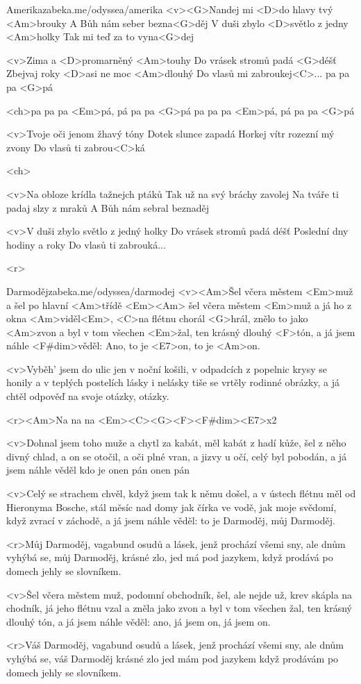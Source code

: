 \begin{song}[Lucie]{24}{Amerika}{zabeka.me/odyssea/amerika}
	<v><G>Nandej mi <D>do hlavy tvý <Am>brouky
	A Bůh nám seber bezna<G>děj
	V duši zbylo <D>světlo z jedny <Am>holky
	Tak mi teď za to vyna<G>dej

	<v>Zima a <D>promarněný <Am>touhy
	Do vrásek stromů padá <G>déšť
	Zbejvaj roky <D>asi ne moc <Am>dlouhý
	Do vlasů mi zabroukej<C>... pa pa pa <G>pá

	<ch>pa pa pa <Em>pá, pá pa pa <G>pá
	pa pa pa <Em>pá, pá pa pa <G>pá

	<v>Tvoje oči jenom žhavý tóny
	Dotek slunce zapadá
	Horkej vítr rozezní mý zvony
	Do vlasů ti zabrou<C>ká

	<ch>

	<v>Na obloze krídla tažnejch ptáků
	Tak už na svý bráchy zavolej
	Na tváře ti padaj slzy z mraků
	A Bůh nám sebral beznaděj

	<v>V duši zbylo světlo z jedný holky
	Do vrásek stromů padá déšť
	Poslední dny hodiny a roky
	Do vlasů ti zabrouká...

	<r>
\end{song}
\begin{song}{25}{Darmoděj}{zabeka.me/odyssea/darmodej}
	<v><Am>Šel včera městem <Em>muž a šel po hlavní <Am>třídě <Em><Am>
	šel včera městem <Em>muž a já ho z okna <Am>viděl<Em>,
	<C>na flétnu chorál <G>hrál, znělo to jako <Am>zvon
	a byl v tom všechen <Em>žal, ten krásný dlouhý <F>tón,
	a já jsem náhle <F#dim>věděl: Ano, to je <E7>on, to je <Am>on.

	<v>Vyběh' jsem do ulic jen v noční košili,
	v odpadcích z popelnic krysy se honily
	a v teplých postelích lásky i nelásky
	tiše se vrtěly rodinné obrázky,
	a já chtěl odpověď na svoje otázky, otázky.

	<r><Am>Na na na <Em><C><G><F><F#dim><E7>x2

	<v>Dohnal jsem toho muže a chytl za kabát,
	měl kabát z hadí kůže, šel z něho divný chlad,
	a on se otočil, a oči plné vran,
	a jizvy u očí, celý byl pobodán,
	a já jsem náhle věděl kdo je onen pán onen pán

	<v>Celý se strachem chvěl,
	když jsem tak k němu došel,
	a v ústech flétnu měl od Hieronyma Bosche,
	stál měsíc nad domy jak čírka ve vodě,
	jak moje svědomí, když zvrací v záchodě,
	a já jsem náhle věděl:
	to je Darmoděj, můj Darmoděj.

	<r>Můj Darmoděj,
	vagabund osudů a lásek,
	jenž prochází všemi sny,
	ale dnům vyhýbá se,
	můj Darmoděj, krásné zlo,
	jed má pod jazykem,
	když prodává po domech jehly se slovníkem.

	<v>Šel včera městem muž, podomní obchodník,
	šel, ale nejde už, krev skápla na chodník,
	já jeho flétnu vzal a zněla jako zvon
	a byl v tom všechen žal, ten krásný dlouhý tón,
	a já jsem náhle věděl:
	ano, já jsem on, já jsem on.

	<r>Váš Darmoděj, vagabund osudů a lásek,
	jenž prochází všemi sny, ale dnům vyhýbá se,
	váš Darmoděj krásné zlo jed mám pod jazykem
	když prodávám po domech jehly se slovníkem.
\end{song}
